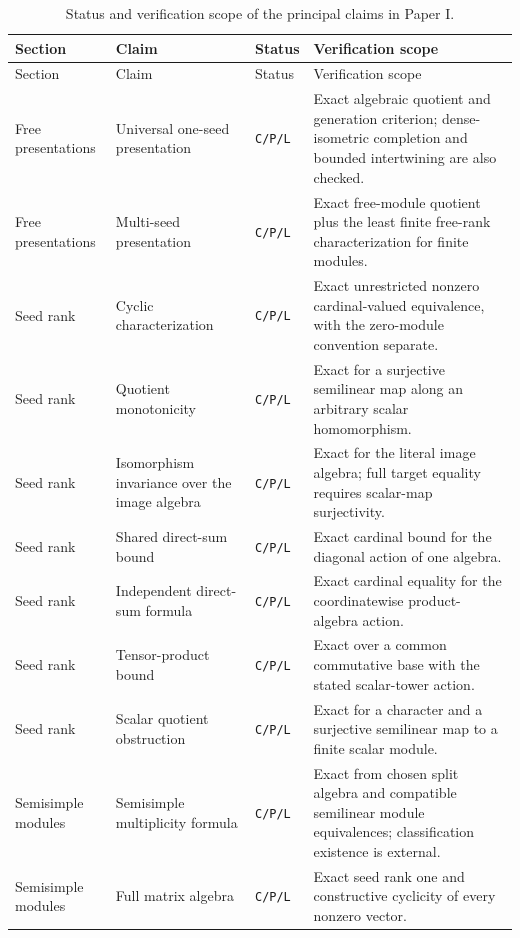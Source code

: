 \documentclass[11pt]{article}
\theoremstyle{definition}
\theoremstyle{remark}
\begin{document}
\begingroup
\small
\setlength{\tabcolsep}{3pt}
\begin{longtable}{L{0.16\textwidth}L{0.25\textwidth}L{0.10\textwidth}L{0.38\textwidth}}
\caption{Status and verification scope of the principal claims in Paper I.}
\label{tab:claim-status}\\
\toprule
Section & Claim & Status & Verification scope \\
\midrule
\endfirsthead
\toprule
Section & Claim & Status & Verification scope \\
\midrule
\endhead
Free presentations & Universal one-seed presentation & \texttt{C/P/L} & Exact algebraic quotient and generation criterion; dense-isometric completion and bounded intertwining are also checked. \\
Free presentations & Multi-seed presentation & \texttt{C/P/L} & Exact free-module quotient plus the least finite free-rank characterization for finite modules. \\
Seed rank & Cyclic characterization & \texttt{C/P/L} & Exact unrestricted nonzero cardinal-valued equivalence, with the zero-module convention separate. \\
Seed rank & Quotient monotonicity & \texttt{C/P/L} & Exact for a surjective semilinear map along an arbitrary scalar homomorphism. \\
Seed rank & Isomorphism invariance over the image algebra & \texttt{C/P/L} & Exact for the literal image algebra; full target equality requires scalar-map surjectivity. \\
Seed rank & Shared direct-sum bound & \texttt{C/P/L} & Exact cardinal bound for the diagonal action of one algebra. \\
Seed rank & Independent direct-sum formula & \texttt{C/P/L} & Exact cardinal equality for the coordinatewise product-algebra action. \\
Seed rank & Tensor-product bound & \texttt{C/P/L} & Exact over a common commutative base with the stated scalar-tower action. \\
Seed rank & Scalar quotient obstruction & \texttt{C/P/L} & Exact for a character and a surjective semilinear map to a finite scalar module. \\
Semisimple modules & Semisimple multiplicity formula & \texttt{C/P/L} & Exact from chosen split algebra and compatible semilinear module equivalences; classification existence is external. \\
Semisimple modules & Full matrix algebra & \texttt{C/P/L} & Exact seed rank one and constructive cyclicity of every nonzero vector. \\

\end{longtable}
\end{document}

